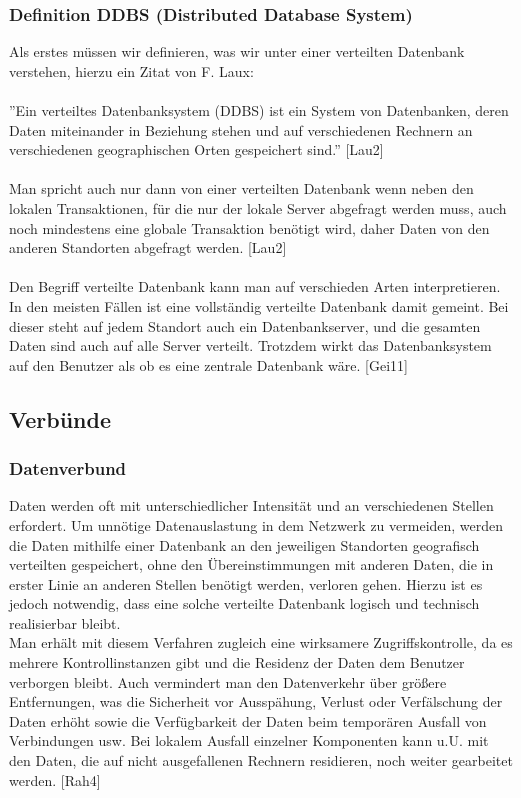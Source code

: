 \documentclass[letterpaper, 12pt]{article}
\let\tempsubsection\subsection
\renewcommand\subsection[1]{\vspace{0cm}\tempsubsection{#1}\vspace{0cm}}
\let\tempsubsubsection\subsubsection
\renewcommand\subsubsection[1]{\vspace{0cm}\tempsubsubsection{#1}\vspace{0cm}}
\begin{document}
\subsubsection{Definition DDBS (Distributed Database System)}
Als erstes müssen wir definieren, was wir unter einer verteilten Datenbank verstehen, hierzu ein Zitat von F. Laux:
\\\\
''Ein verteiltes Datenbanksystem (DDBS) ist ein System von Datenbanken, deren Daten miteinander in Beziehung stehen und auf verschiedenen Rechnern an verschiedenen geographischen Orten gespeichert sind.'' [Lau2]
\\\\
Man spricht auch nur dann von einer verteilten Datenbank wenn neben den lokalen Transaktionen, für die nur der lokale Server abgefragt werden muss, auch noch mindestens eine globale Transaktion benötigt wird, daher Daten von den anderen Standorten abgefragt werden. [Lau2]
\\\\
Den Begriff verteilte Datenbank kann man auf verschieden Arten interpretieren.
In den meisten Fällen ist eine vollständig verteilte Datenbank damit gemeint. Bei dieser steht auf jedem Standort auch ein Datenbankserver, und die gesamten Daten sind auch auf alle Server verteilt. Trotzdem wirkt das Datenbanksystem auf den Benutzer als ob es eine zentrale Datenbank wäre. [Gei11]
\subsection{Verbünde}
\subsubsection{Datenverbund}
Daten werden oft mit unterschiedlicher Intensität und an verschiedenen Stellen erfordert. Um unnötige Datenauslastung in dem Netzwerk zu vermeiden, werden die Daten mithilfe einer Datenbank an den jeweiligen Standorten geografisch verteilten gespeichert, ohne den Übereinstimmungen mit anderen Daten, die in erster Linie an anderen Stellen benötigt werden, verloren gehen. Hierzu ist es jedoch notwendig, dass eine solche verteilte Datenbank logisch und technisch realisierbar bleibt.
\\
Man erhält mit diesem Verfahren zugleich eine wirksamere Zugriffskontrolle, da es mehrere Kontrollinstanzen gibt und die Residenz der Daten dem Benutzer verborgen bleibt. Auch vermindert man den Datenverkehr über größere Entfernungen, was die Sicherheit vor Ausspähung, Verlust oder Verfälschung der Daten erhöht sowie die Verfügbarkeit der Daten beim temporären Ausfall von Verbindungen usw. Bei lokalem Ausfall einzelner Komponenten kann u.U. mit den Daten, die auf nicht ausgefallenen Rechnern residieren, noch weiter gearbeitet werden. [Rah4]
\end{document}
